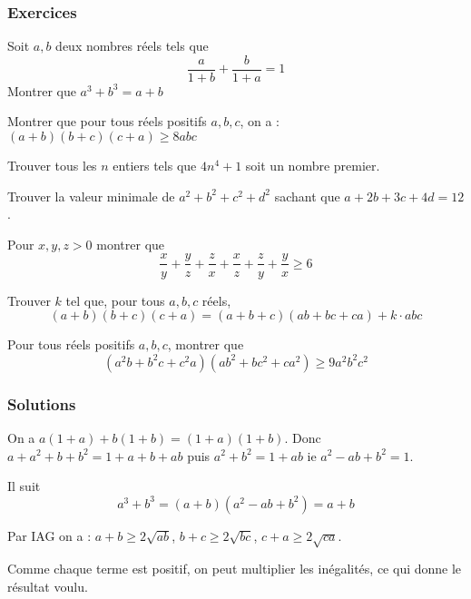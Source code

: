 \subsubsection{Exercices}


\begin{exo}
Soit $a, b$ deux nombres réels tels que
$$\frac a{1 + b} + \frac b{1 + a} = 1$$
Montrer que $a^3 + b^3 = a + b$
\end{exo}


\begin{exo}
Montrer que pour tous réels positifs $a,b,c$, on a : $ (a+b)(b+c)(c+a)\ge 8abc$
\end{exo}


\begin{exo}
Trouver tous les $n$ entiers tels que $4n^4+1$ soit un nombre premier.
\end{exo}


\begin{exo}
Trouver la valeur minimale de $a^2+b^2+c^2+d^2$ sachant que $a+2b+3c+4d=12$.
\end{exo}


\begin{exo}
Pour $x, y, z > 0$ montrer que
$$ \frac xy + \frac yz + \frac zx + \frac xz + \frac zy + \frac yx \ge 6$$
\end{exo}


\begin{exo}
Trouver $k$ tel que, pour tous $a, b, c$ réels,
$$(a+b)(b+c)(c+a) = (a+b+c)(ab+bc+ca) + k\cdot abc $$
\end{exo}


\begin{exo}
Pour tous réels positifs $a,b,c$, montrer que
$$(a^2b+b^2c+c^2a)(ab^2+bc^2+ca^2)\ge 9a^2b^2c^2$$
\end{exo}


\subsubsection{Solutions}


\begin{sol}
On a $a(1+a)+b(1+b)=(1+a)(1+b)$. Donc $a+a^2+b+b^2=1+a+b+ab$ puis $a^2+b^2=1+ab$ ie $a^2-ab+b^2 = 1$.

Il suit
$$a^3+b^3=(a+b)(a^2-ab+b^2)=a+b$$
\end{sol}


\begin{sol}
Par IAG on a : $a+b\ge 2\sqrt{ab}$, $b+c\ge 2\sqrt{bc}$, $c+a\ge 2\sqrt{ca}$.

Comme chaque terme est positif, on peut multiplier les inégalités, ce qui donne le résultat voulu.
\end{sol}


